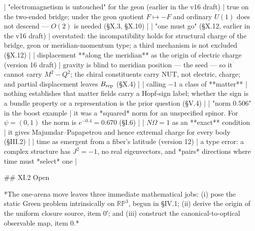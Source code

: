 | "electromagnetism is untouched" for the geon (earlier in the v16 draft) | true on the two-ended bridge; under the geon quotient $F\mapsto-F$ and ordinary $U(1)$ does not descend — $O(2)$ is needed (§X.3, §X.10) |
| "one must go" (§X.12, earlier in the v16 draft) | overstated: the incompatibility holds for structural charge of the bridge, geon or meridian-momentum type; a third mechanism is not excluded (§X.12) |
| displacement **along the meridian** as the origin of electric charge (version 16 draft) | gravity is blind to meridian position — the seed — so it cannot carry $M^2-Q^2$; the chiral constituents carry NUT, not electric, charge; and partial displacement leaves $B_{\rm rep}$ (§X.4) |
| calling $-1$ a class of **matter** | nothing establishes that matter fields carry a Hopf-sign label; whether the sign is a bundle property or a representation is the prior question (§V.4) |
| "norm $0.506$" in the boost example | it was a *squared* norm for an unspecified spinor. For $\psi = (0,1)$ the norm is $e^{-0.4} = 0.670$ (§I.6) |
| $N\Omega = 1$ as an **exact** condition | it gives Majumdar–Papapetrou and hence extremal charge for every body (§III.2) |
| time as emergent from a fiber's latitude (version 12) | a type error: a complex structure has $J^2 = -1$, no real eigenvectors, and *pairs* directions where time must *select* one |

## XI.2 Open

*The one-arena move leaves three immediate mathematical jobs: (i) pose the static Green problem intrinsically on $\mathbb{RP}^3$, begun in §IV.1; (ii) derive the origin of the uniform closure source, item 0′; and (iii) construct the canonical-to-optical observable map, item 0.*

